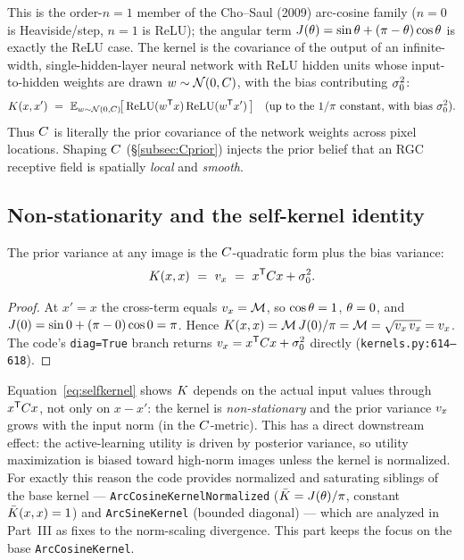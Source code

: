 \begin{remark}
This is the order-$n=1$ member of the Cho--Saul (2009) arc-cosine family
($n=0$ is Heaviside/step, $n=1$ is ReLU); the angular term
$J(\theta)=\sin\theta+(\pi-\theta)\cos\theta$ is exactly the ReLU case. The kernel
is the covariance of the output of an infinite-width, single-hidden-layer neural
network with ReLU hidden units whose input-to-hidden weights are drawn
$w\sim\mathcal{N}(0,C)$, with the bias contributing $\sigma_{0}^2$:
\begin{equation}
\Kf(x,x')\ =\ \E_{w\sim\Gauss(0,\Cmat)}\!\big[\,\mathrm{ReLU}(w\transpose x)\,\mathrm{ReLU}(w\transpose x')\,\big]
\quad\text{(up to the $1/\pi$ constant, with bias $\sigz^2$).}
\end{equation}
Thus $C$ is literally the prior covariance of the network weights across pixel
locations. Shaping $C$ (\S\ref{subsec:Cprior}) injects the prior belief that an
RGC receptive field is spatially \emph{local} and \emph{smooth}.
\end{remark}

\subsection{Non-stationarity and the self-kernel identity}
\label{subsec:selfkernel}

\begin{proposition}
The prior variance at any image is the $C$-quadratic form plus the bias
variance:
\begin{equation}
\Kf(x,x)\ =\ \vmag_x\ =\ x\transpose\Cmat x+\sigz^2.
\label{eq:selfkernel}
\end{equation}
\end{proposition}

\begin{proof}
At $x'=x$ the cross-term equals $v_x=\mathcal{M}$, so $\cos\theta=1$, $\theta=0$, and
$J(0)=\sin0+(\pi-0)\cos0=\pi$. Hence
$K(x,x)=\mathcal{M}\,J(0)/\pi=\mathcal{M}=\sqrt{v_x\,v_x}=v_x$. The code's
\texttt{diag=True} branch returns $v_x=x^{\mathsf{T}}C x+\sigma_{0}^2$ directly
(\texttt{kernels.py:614--618}).
\end{proof}

\begin{remark}
Equation~\eqref{eq:selfkernel} shows $K$ depends on the actual input values
through $x^{\mathsf{T}}C x$, not only on $x-x'$: the kernel is \emph{non-stationary}
and the prior variance $v_x$ grows with the input norm (in the $C$-metric).
This has a direct downstream effect: the active-learning utility is driven by
posterior variance, so utility maximization is biased toward high-norm images
unless the kernel is normalized. For exactly this reason the code provides
normalized and saturating siblings of the base kernel --- \texttt{ArcCosineKernelNormalized}
($\bar{K}=J(\theta)/\pi$, constant $\bar{K}(x,x)=1$) and \texttt{ArcSineKernel}
(bounded diagonal) --- which are analyzed in Part~III as fixes to the norm-scaling
divergence. This part keeps the focus on the base \texttt{ArcCosineKernel}.
\end{remark}

